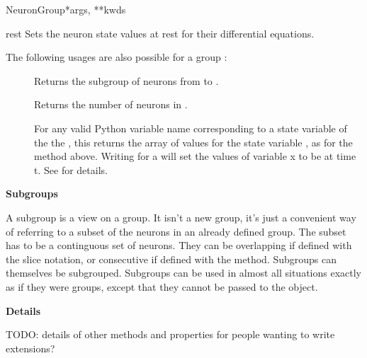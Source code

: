 \documentclass[letterpaper,10pt,english]{manual}
\begin{document}
\begin{classdesc}{NeuronGroup}{*args, **kwds}
\hypertarget{brian.NeuronGroup.rest}{}\begin{methoddesc}{rest}{}
Sets the neuron state values at rest for their differential
equations.
\end{methoddesc}

The following usages are also possible for a group :
\begin{description}
\item[]
Returns the subgroup of neurons from  to .

\item[]
Returns the number of neurons in .

\item[]
For any valid Python variable name  corresponding to
a state variable of the the \hyperlink{brian.NeuronGroup}{}, this
returns the array of values for the state
variable , as for the \hyperlink{brian.NeuronGroup.state}{} method
above. Writing  for  a \hyperlink{brian.TimedArray}{}
will set the values of variable x to be  at time t.
See \hyperlink{brian.TimedArraySetter}{} for details.

\end{description}

\textbf{Subgroups}

A subgroup is a view on a group. It isn't a new group, it's just
a convenient way of referring to a subset of the neurons in an
already defined group. The subset has to be a continguous set of
neurons. They can be overlapping if defined with the slice
notation, or consecutive if defined with the \hyperlink{brian.NeuronGroup.subgroup}{} method.
Subgroups can themselves be subgrouped. Subgroups can be used in
almost all situations exactly as if they were groups, except that
they cannot be passed to the \hyperlink{brian.Network}{} object.

\textbf{Details}

TODO: details of other methods and properties for people
wanting to write extensions?
\end{classdesc}
\end{document}
